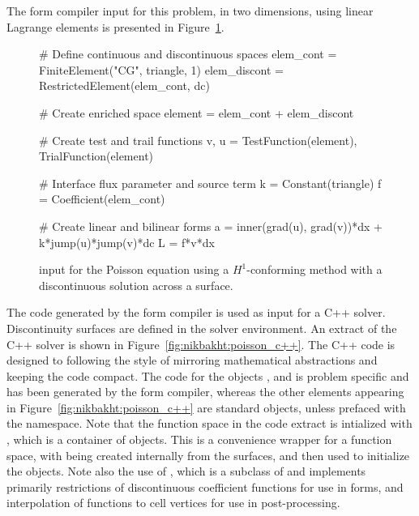 The form compiler input for this problem,
in two dimensions, using linear Lagrange elements is presented in
Figure~\ref{code:nikbakht:Poisson}.
%
\begin{figure}
\begin{python}
# Define continuous and discontinuous spaces
elem_cont    = FiniteElement("CG", triangle, 1)
elem_discont = RestrictedElement(elem_cont, dc)

# Create enriched space
element = elem_cont + elem_discont

# Create test and trail functions
v, u = TestFunction(element), TrialFunction(element)

# Interface flux parameter and source term
k = Constant(triangle)
f = Coefficient(elem_cont)

# Create linear and bilinear forms
a = inner(grad(u), grad(v))*dx + k*jump(u)*jump(v)*dc
L = f*v*dx
\end{python}
\caption{{\ufl} input for the Poisson equation using a $H^{1}$-conforming
method with a discontinuous solution across a surface.}
\label{code:nikbakht:Poisson}
\end{figure}
%
The code generated by the form compiler is used as input
for a C++ solver. Discontinuity surfaces are defined in the
solver environment.  An extract of the C++ solver is shown in
Figure~\ref{fig:nikbakht:poisson_c++}.  The C++ code is designed
to following the {\dolfin} style of mirroring mathematical
abstractions and keeping the code compact.  The code for the
objects , 
and  is problem specific and has been
generated by the form compiler, whereas the other elements appearing in
Figure~\ref{fig:nikbakht:poisson_c++} are standard {\dolfin} objects,
unless prefaced with the  namespace. Note that the function
space in the code extract is intialized with , which
is a container of  objects. This is a convenience
wrapper for a \ufc{} function space, with  being created
internally from the surfaces, and then used to initialize the
\ufc{} objects.  Note also the use of , which is a
subclass of  and implements primarily restrictions
of discontinuous coefficient functions for use in forms, and interpolation
of functions to cell vertices for use in post-processing.
%
